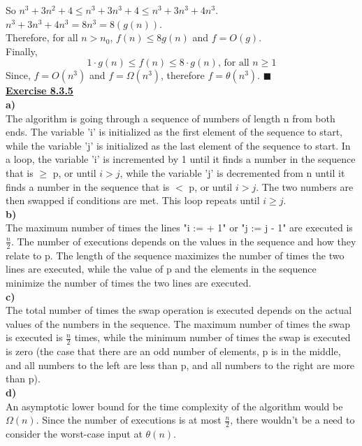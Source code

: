 \documentclass[12pt, letterpaper, twoside]{article}
\begin{document}
So $n^3 + 3n^2 + 4 \leq  n^3 + 3n^3 + 4 \leq n^3 + 3n^3 + 4n^3$.\\
$n^3 + 3n^3 + 4n^3 = 8n^3 = 8(g(n))$.\\
Therefore, for all $n > n_{0}$, $f(n) \leq 8g(n)$ and $f = O(g)$.\\
\break
Finally, 
\[1 \cdot g(n) \leq f(n) \leq 8 \cdot g(n) \text{, for all } n \geq 1\]
Since, $f = O(n^3)$ and $f = \Omega(n^3)$, therefore $f = \theta(n^3)$. $\blacksquare$\\
\newpage\noindent\textbf{\underline{Exercise 8.3.5}}\\
\break
\textbf{a)} \\
The algorithm is going through a sequence of numbers of length n from both ends. The variable 'i' is initialized as the first element of the sequence to start, while the variable 'j' is initialized as the last element of the sequence to start. In a loop, the variable 'i' is incremented by 1 until it finds a number in the sequence that is $\geq$ p, or until $i > j$, while the variable 'j' is decremented from n until it finds a number in the sequence that is $<$ p, or until $i > j$. The two numbers are then swapped if conditions are met. This loop repeats until $i \geq j$.\\
\break
\textbf{b)} \\
The maximum number of times the lines "i := + 1" or "j := j - 1" are executed is $\frac{n}{2}$. The number of executions depends on the values in the sequence and how they relate to p. The length of the sequence maximizes the number of times the two lines are executed, while the value of p and the elements in the sequence minimize the number of times the two lines are executed.\\
\break
\textbf{c)} \\
The total number of times the swap operation is executed depends on the actual values of the numbers in the sequence. The maximum number of times the swap is executed is $\frac{n}{2}$ times, while the minimum number of times the swap is executed is zero (the case that there are an odd number of elements, p is in the middle, and all numbers to the left are less than p, and all numbers to the right are more than p).\\
\break
\textbf{d)} \\
An asymptotic lower bound for the time complexity of the algorithm would be $\Omega(n)$. Since the number of executions is at most $\frac{n}{2}$, there wouldn't be a need to consider the worst-case input at $\theta(n)$.\\
\end{document}
